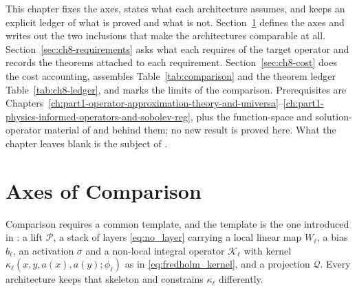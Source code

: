 This chapter fixes the axes, states what each architecture assumes, and keeps an explicit ledger of what is proved and what is not. Section~\ref{sec:ch8-axes} defines the axes and writes out the two inclusions that make the architectures comparable at all. Section~\ref{sec:ch8-requirements} asks what each requires of the target operator and records the theorems attached to each requirement. Section~\ref{sec:ch8-cost} does the cost accounting, assembles Table~\ref{tab:comparison} and the theorem ledger Table~\ref{tab:ch8-ledger}, and marks the limits of the comparison. Prerequisites are Chapters~\ref{ch:part1-operator-approximation-theory-and-universa}--\ref{ch:part1-physics-informed-operators-and-sobolev-reg}, plus the function-space and solution-operator material of  and  behind them; no new result is proved here. What the chapter leaves blank is the subject of .

\section{Axes of Comparison}
\label{sec:ch8-axes}

Comparison requires a common template, and the template is the one introduced in : a lift $\mathcal{P}$, a stack of layers \eqref{eq:no_layer} carrying a local linear map $W_\ell$, a bias $b_\ell$, an activation $\sigma$ and a non-local integral operator $\mathcal{K}_\ell$ with kernel $\kappa_\ell(x,y,a(x),a(y);\phi_\ell)$ as in \eqref{eq:fredholm_kernel}, and a projection $\mathcal{Q}$. Every architecture keeps that skeleton and constrains $\kappa_\ell$ differently. 

